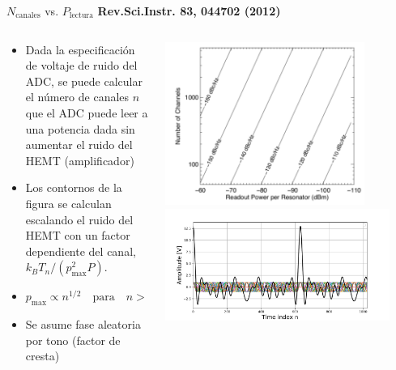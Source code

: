 \documentclass[ignorenonframetext,12pt]{beamer}
\begin{document}
		\begin{frame}{$N_\text{canales}$ vs. $P_\text{lectura}$}
			\footnotesize{\textbf{Rev.Sci.Instr. 83, 044702 (2012)}}
			\begin{columns}
				\begin{column}{0.4\textwidth}
					\begin{itemize}
						\item \footnotesize{Dada la especificación de
							voltaje de ruido del ADC, se puede
							calcular el número de canales
							{\color{red}$n$} que el ADC puede leer
							a una potencia dada sin aumentar el
							ruido del HEMT (amplificador)}
						\item Los contornos de la figura se calculan
							escalando  el ruido del HEMT con un
							factor dependiente del canal, $k_B
							T_n /(p_\text{max}^2 P)$.
						\item $p_\text{max} \propto
							n^{1/2}\quad\text{para}\quad n >> 1$
						\item {\color{blue}Se asume fase aleatoria por
							tono (factor de cresta)}
					\end{itemize}
				\end{column}
				\begin{column}{0.6\textwidth}
					\centering
					\includegraphics[width=0.8\textwidth]{power_vs_Nchannels2}
					\includegraphics[width=0.9\textwidth]{in_spectrum_time}
				\end{column}
			\end{columns}
		\end{frame}
\end{document}
